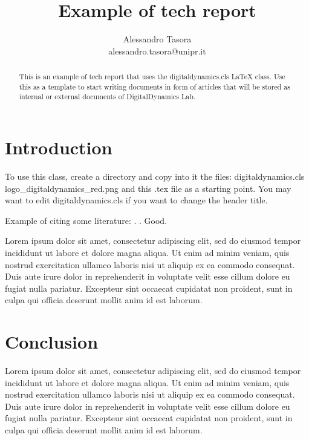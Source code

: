 \documentclass{digitaldynamics}
\begin{document}
\title{Example of tech report}

\author{Alessandro Tasora \\ alessandro.tasora@unipr.it}

\maketitle
\thispagestyle{fancy}


\begin{abstract} 

This is an example of tech report that uses the digitaldynamics.cls LaTeX class.
Use this as a template to start writing documents in form of articles that will
be stored as internal or external documents of DigitalDynamics Lab.

\end{abstract}





\section{Introduction}

To use this class, create a directory and copy into it the files: digitaldynamics.cls  logo\_digitaldynamics\_red.png  and this .tex file as a starting point. 
You may want to edit digitaldynamics.cls if you want to change the header title.

Example of citing some literature: \cite{cosserat1909}. \cite{anderson00}. Good.

Lorem ipsum dolor sit amet, consectetur adipiscing elit, sed do eiusmod tempor incididunt ut labore et dolore magna aliqua. Ut enim ad minim veniam, quis nostrud exercitation ullamco laboris nisi ut aliquip ex ea commodo consequat. Duis aute irure dolor in reprehenderit in voluptate velit esse cillum dolore eu fugiat nulla pariatur. Excepteur sint occaecat cupidatat non proident, sunt in culpa qui officia deserunt mollit anim id est laborum.



\section{Conclusion}

Lorem ipsum dolor sit amet, consectetur adipiscing elit, sed do eiusmod tempor incididunt ut labore et dolore magna aliqua. Ut enim ad minim veniam, quis nostrud exercitation ullamco laboris nisi ut aliquip ex ea commodo consequat. Duis aute irure dolor in reprehenderit in voluptate velit esse cillum dolore eu fugiat nulla pariatur. Excepteur sint occaecat cupidatat non proident, sunt in culpa qui officia deserunt mollit anim id est laborum.



\printbibliography
\end{document}
